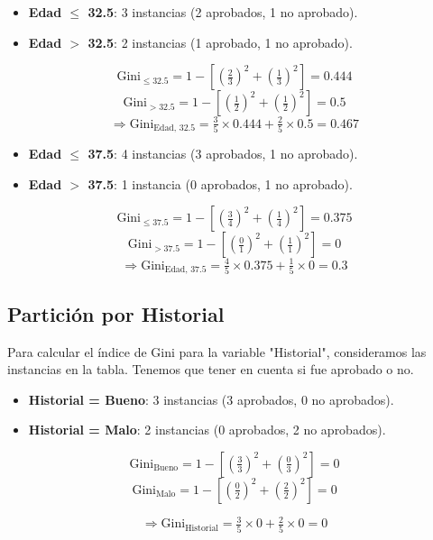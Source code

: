 \documentclass[12pt]{article}
\begin{document}
\begin{itemize}
  \item \textbf{Edad $\leq$ 32.5}: 3 instancias (2 aprobados, 1 no aprobado).
  \item \textbf{Edad $>$ 32.5}: 2 instancias (1 aprobado, 1 no aprobado).
\end{itemize}

\[
  \mathrm{Gini}_{\leq 32.5} = 1 - \left[\left(\tfrac{2}{3}\right)^2 + \left(\tfrac{1}{3}\right)^2\right] = 0.444
\]
\[
  \mathrm{Gini}_{> 32.5} = 1 - \left[\left(\tfrac{1}{2}\right)^2 + \left(\tfrac{1}{2}\right)^2\right] = 0.5
\]
\[
  \Rightarrow \mathrm{Gini}_{\text{Edad, 32.5}} = \tfrac{3}{5}\times0.444 + \tfrac{2}{5}\times0.5 = 0.467
\]

\begin{itemize}
  \item \textbf{Edad $\leq$ 37.5}: 4 instancias (3 aprobados, 1 no aprobado).
  \item \textbf{Edad $>$ 37.5}: 1 instancia (0 aprobados, 1 no aprobado).
\end{itemize}

\[
  \mathrm{Gini}_{\leq 37.5} = 1 - \left[\left(\tfrac{3}{4}\right)^2 + \left(\tfrac{1}{4}\right)^2\right] = 0.375
\]
\[
  \mathrm{Gini}_{> 37.5} = 1 - \left[\left(\tfrac{0}{1}\right)^2 + \left(\tfrac{1}{1}\right)^2\right] = 0
\]
\[
  \Rightarrow \mathrm{Gini}_{\text{Edad, 37.5}} = \tfrac{4}{5}\times0.375 + \tfrac{1}{5}\times0 = 0.3
\]


\subsection{Partición por Historial}
Para calcular el índice de Gini para la variable "Historial", consideramos las instancias en la tabla. Tenemos que tener en cuenta si fue aprobado o no.

\begin{itemize}
  \item \textbf{Historial = Bueno}: 3 instancias (3 aprobados, 0 no aprobados).
  \item \textbf{Historial = Malo}: 2 instancias (0 aprobados, 2 no aprobados).
\end{itemize}

\[
  \mathrm{Gini}_{\text{Bueno}} = 1 - \left[\left(\tfrac{3}{3}\right)^2 + \left(\tfrac{0}{3}\right)^2\right] = 0
\]
\[
  \mathrm{Gini}_{\text{Malo}} = 1 - \left[\left(\tfrac{0}{2}\right)^2 + \left(\tfrac{2}{2}\right)^2\right] = 0
\]

\[
  \Rightarrow \mathrm{Gini}_{\text{Historial}} = \tfrac{3}{5}\times0 + \tfrac{2}{5}\times0 = 0
\]
\end{document}
